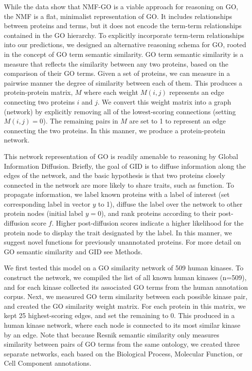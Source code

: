 \documentclass[12pt,a4paper]{report}
\begin{document}
{{While the data show that NMF-GO is a viable approach for reasoning on GO, the NMF is a flat, minimalist representation of GO. It includes relationships between proteins and terms, but it does not encode the term-term relationships contained in the GO hierarchy. To explicitly incorporate term-term relationships into our predictions, we designed an alternative reasoning schema for GO, rooted in the concept of GO term semantic similarity. GO term semantic similarity is a measure that reflects the similarity between any two proteins, based on the comparison of their GO terms. Given a set of proteins, we can measure in a pairwise manner the degree of similarity between each of them. This produces a protein-protein matrix, $M$ where each weight $M(i,j)$ represents an edge connecting two proteins $i$ and $j$. We convert this weight matrix into a graph (network) by explicitly removing all of the lowest-scoring connections (setting $M(i,j)=0$). The remaining pairs in $M$ are set to 1 to represent an edge connecting the two proteins. In this manner, we produce a protein-protein network.

This network representation of GO is readily amenable to reasoning by Global Information Diffusion. Briefly, the goal of GID is to diffuse information along the edges of the network, and the basic hypothesis is that two proteins closely connected in the network are more likely to share traits, such as function. To propagate information, we label known proteins with a label of interest (set corresponding label in vector $y$ to 1), diffuse the label over the network to other protein nodes (initial label $y=0$), and rank proteins according to their post-diffusion score $f$. Higher post-diffusion scores indicate a higher likelihood for the protein node to display the trait designated by the label. In this manner, we suggest novel functions for previously unannotated proteins. For more detail on GO semantic similarity and GID see Methods.

We first tested this model on a GO similarity network of 509 human kinases. To construct the network, we compiled the list of all known human kinases (n=509), and for each kinase collected its associated GO terms from the human annotation corpus. Next, we measured GO term similarity between each possible kinase pair, and created the GO similarity weight matrix. For each protein in this matrix, we kept 25 highest-scoring edges, and set the remaining to 0. This produced in a human kinase network, where each node is connected to its most similar kinase by an edge. Note that because Resnik semantic similarity only measures similarity between pairs of GO terms from the same ontology, we created three separate networks, each based on the Biological Process, Molecular Function, or Cell Component annotations.

}}
\end{document}
